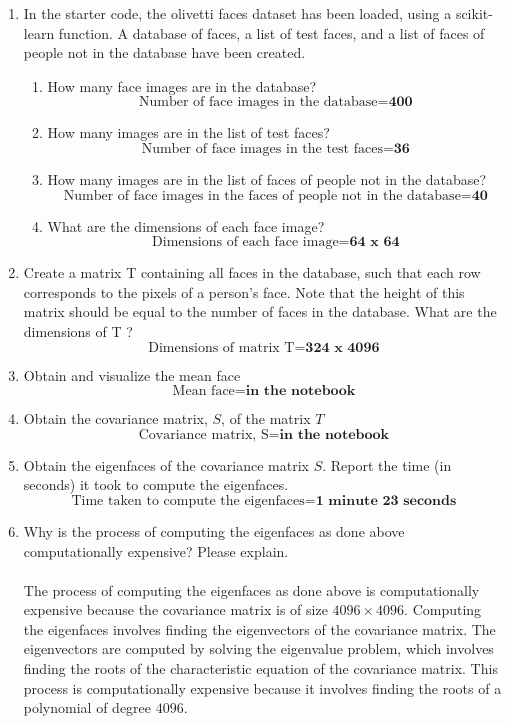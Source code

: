 \documentclass[12pt]{extarticle} %
\begin{document}
\begin{enumerate}
    \item In the starter code, the olivetti faces dataset has been loaded, using a scikit-learn function. A database
    of faces, a list of test faces, and a list of faces of people not in the database have been created.
    \begin{enumerate}
        \item How many face images are in the database? 
        \[
        \text{Number of face images in the database} = \textbf{400}
        \]
        \item How many images are in the list of test faces?
        \[
        \text{Number of face images in the test faces} = \textbf{36}
        \]
        \item How many images are in the list of faces of people not in the database?
        \[
        \text{Number of face images in the faces of people not in the database} = \textbf{40}
        \]
        \item What are the dimensions of each face image?
        \[
        \text{Dimensions of each face image} = \textbf{64 x 64}
        \]
    \end{enumerate}    
    \item Create a matrix T containing all faces in the database, such that each row corresponds to the pixels
    of a person’s face. Note that the height of this matrix should be equal to the number of faces in the
    database. What are the dimensions of T ?
    \[
    \text{Dimensions of matrix T} = \textbf{324 x 4096} 
    \]
    \item Obtain and visualize the mean face
    \[
    \text{Mean face} = \textbf{in the notebook}
    \]
    \item Obtain the covariance matrix, \(S\), of the matrix \(T\)
    \[
        \text{Covariance matrix, S} = \textbf{in the notebook}
    \]
    \item Obtain the eigenfaces of the covariance matrix \(S\). Report the time (in seconds) it took to compute the eigenfaces.
   \[
   \text{Time taken to compute the eigenfaces} = \textbf{1 minute 23 seconds}
   \]
    \item  Why is the process of computing the eigenfaces as done above computationally expensive? Please
    explain.
    \\\\ The process of computing the eigenfaces as done above is computationally expensive because the covariance matrix is of size \(4096 \times 4096\). Computing the eigenfaces involves finding the eigenvectors of the covariance matrix. The eigenvectors are computed by solving the eigenvalue problem, which involves finding the roots of the characteristic equation of the covariance matrix. This process is computationally expensive because it involves finding the roots of a polynomial of degree \(4096\).

\end{enumerate}
\end{document}
